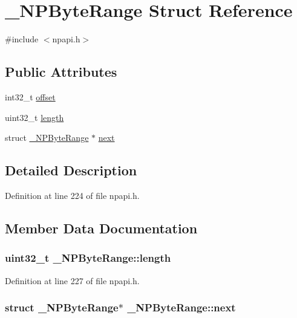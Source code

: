 \hypertarget{struct___n_p_byte_range}{
\section{\_\-NPByteRange Struct Reference}
\label{struct___n_p_byte_range}
}


{\ttfamily \#include $<$npapi.h$>$}

\subsection*{Public Attributes}
\begin{DoxyCompactItemize}
\item 
int32\_\-t \hyperlink{struct___n_p_byte_range_aeedbe57bcd478d8a710389e38d8b5ed4}{offset}
\item 
uint32\_\-t \hyperlink{struct___n_p_byte_range_a028708d81ee826bd7b700ddc00bb4b0c}{length}
\item 
struct \hyperlink{struct___n_p_byte_range}{\_\-NPByteRange} $\ast$ \hyperlink{struct___n_p_byte_range_a28029f9b5fcd4b7548108885e26222e3}{next}
\end{DoxyCompactItemize}


\subsection{Detailed Description}


Definition at line 224 of file npapi.h.



\subsection{Member Data Documentation}
\hypertarget{struct___n_p_byte_range_a028708d81ee826bd7b700ddc00bb4b0c}{
\subsubsection[{length}]{\setlength{\rightskip}{0pt plus 5cm}uint32\_\-t {\bf \_\-NPByteRange::length}}}
\label{struct___n_p_byte_range_a028708d81ee826bd7b700ddc00bb4b0c}


Definition at line 227 of file npapi.h.

\hypertarget{struct___n_p_byte_range_a28029f9b5fcd4b7548108885e26222e3}{
\subsubsection[{next}]{\setlength{\rightskip}{0pt plus 5cm}struct {\bf \_\-NPByteRange}$\ast$ {\bf \_\-NPByteRange::next}}}
\label{struct___n_p_byte_range_a28029f9b5fcd4b7548108885e26222e3}



